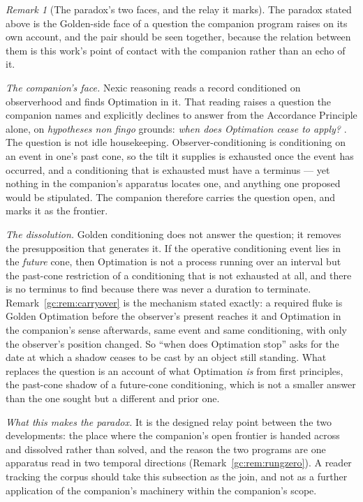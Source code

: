\documentclass[11pt]{article}
\numberwithin{equation}{section}
\theoremstyle{plain}
\theoremstyle{definition}
\theoremstyle{remark}
\newtheorem{remark}[theorem]{Remark}
\begin{document}
\begin{remark}[The paradox's two faces, and the relay it marks]
\label{ra:rem:relay}
The paradox stated above is the Golden-side face of a question the
companion program raises on its own account, and the pair should be
seen together, because the relation between them is this work's point
of contact with the companion rather than an echo of it.

\emph{The companion's face.} Nexic reasoning reads a record conditioned
on observerhood and finds Optimation in it. That reading raises a
question the companion names and explicitly declines to answer from the
Accordance Principle alone, on \emph{hypotheses non fingo} grounds:
\emph{when does Optimation cease to apply?} \cite{Aethus}. The question
is not idle housekeeping. Observer-conditioning is conditioning on an
event in one's past cone, so the tilt it supplies is exhausted once the
event has occurred, and a conditioning that is exhausted must have a
terminus --- yet nothing in the companion's apparatus locates one, and
anything one proposed would be stipulated. The companion therefore
carries the question open, and marks it as the frontier.

\emph{The dissolution.} Golden conditioning does not answer the
question; it removes the presupposition that generates it. If the
operative conditioning event lies in the \emph{future} cone, then
Optimation is not a process running over an interval but the past-cone
restriction of a conditioning that is not exhausted at all, and there
is no terminus to find because there was never a duration to
terminate. Remark~\ref{gc:rem:carryover} is the mechanism stated
exactly: a required fluke is Golden Optimation before the observer's
present reaches it and Optimation in the companion's sense afterwards,
same event and same conditioning, with only the observer's position
changed. So ``when does Optimation stop'' asks for the date at which a
shadow ceases to be cast by an object still standing. What replaces the
question is an account of what Optimation \emph{is} from first
principles, the past-cone shadow of a future-cone conditioning, which is not a smaller answer than the one sought but a different and
prior one.

\emph{What this makes the paradox.} It is the designed relay point
between the two developments: the place where the companion's open
frontier is handed across and dissolved rather than solved, and the
reason the two programs are one apparatus read in two temporal
directions (Remark~\ref{gc:rem:rungzero}). A reader tracking the corpus
should take this subsection as the join, and not as a further
application of the companion's machinery within the companion's scope.


\end{remark}
\end{document}
